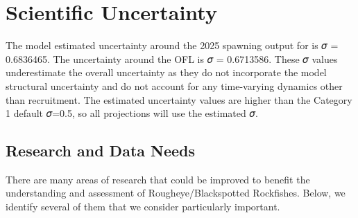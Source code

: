 \documentclass[
]{scrartcl}
\begin{document}
\section{Scientific Uncertainty}\label{scientific-uncertainty}

The model estimated uncertainty around the 2025 spawning output for is 𝜎
= 0.6836465. The uncertainty around the OFL is 𝜎 = 0.6713586. These 𝜎
values underestimate the overall uncertainty as they do not incorporate
the model structural uncertainty and do not account for any time-varying
dynamics other than recruitment. The estimated uncertainty values are
higher than the Category 1 default 𝜎=0.5, so all projections will use
the estimated 𝜎.

\subsection{Research and Data Needs}\label{research-and-data-needs}

There are many areas of research that could be improved to benefit the
understanding and assessment of Rougheye/Blackspotted Rockfishes. Below,
we identify several of them that we consider particularly important.
\end{document}
